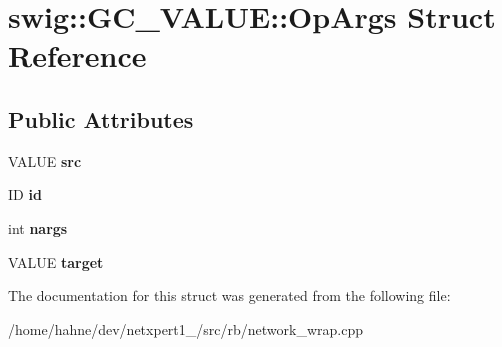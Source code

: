 \hypertarget{structswig_1_1GC__VALUE_1_1OpArgs}{}\section{swig\+:\+:G\+C\+\_\+\+V\+A\+L\+UE\+:\+:Op\+Args Struct Reference}
\label{structswig_1_1GC__VALUE_1_1OpArgs}
\subsection*{Public Attributes}
\begin{DoxyCompactItemize}
\item 
V\+A\+L\+UE {\bfseries src}\hypertarget{structswig_1_1GC__VALUE_1_1OpArgs_a308e9435067de16646b18e7a56c9345e}{}\label{structswig_1_1GC__VALUE_1_1OpArgs_a308e9435067de16646b18e7a56c9345e}

\item 
ID {\bfseries id}\hypertarget{structswig_1_1GC__VALUE_1_1OpArgs_a4b46589cd7b60353cd48caaf267399ae}{}\label{structswig_1_1GC__VALUE_1_1OpArgs_a4b46589cd7b60353cd48caaf267399ae}

\item 
int {\bfseries nargs}\hypertarget{structswig_1_1GC__VALUE_1_1OpArgs_ad6a96534797342c6046e409c9d3b7085}{}\label{structswig_1_1GC__VALUE_1_1OpArgs_ad6a96534797342c6046e409c9d3b7085}

\item 
V\+A\+L\+UE {\bfseries target}\hypertarget{structswig_1_1GC__VALUE_1_1OpArgs_a019d07fcd97626a22514e8a7595877c2}{}\label{structswig_1_1GC__VALUE_1_1OpArgs_a019d07fcd97626a22514e8a7595877c2}

\end{DoxyCompactItemize}


The documentation for this struct was generated from the following file\+:\begin{DoxyCompactItemize}
\item 
/home/hahne/dev/netxpert1\+\_/src/rb/network\+\_\+wrap.\+cpp\end{DoxyCompactItemize}
